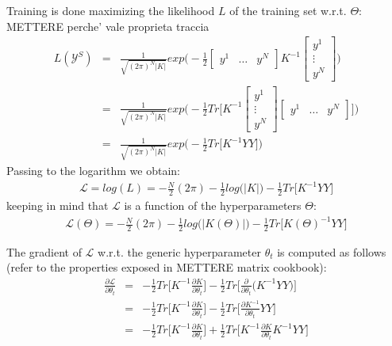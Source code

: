 \documentclass{article}
\begin{document}
Training is done maximizing the likelihood $L$ of the training set w.r.t. $\Theta$:
METTERE perche' vale proprieta traccia
\begin{eqnarray}
L(\mathcal{Y}^S) &=& 
\frac{1}{\sqrt{(2 \pi)^N \left | K \right | }}
exp \bigg ( - \frac{1}{2}
\begin{bmatrix} y^1 & \hdots & y^N \end{bmatrix} 
K^{-1}
\begin{bmatrix} y^1 \\ \vdots \\ y^N \end{bmatrix} 
\bigg ) \\
&=& 
\frac{1}{\sqrt{(2 \pi)^N \left | K \right | }}
exp \bigg ( - \frac{1}{2}
Tr \bigg [ 
K^{-1}
\begin{bmatrix} y^1 \\ \vdots \\ y^N \end{bmatrix} 
\begin{bmatrix} y^1 & \hdots & y^N \end{bmatrix} 
\bigg ]
\bigg ) \\
&=&
\frac{1}{\sqrt{(2 \pi)^N \left | K \right | }}
exp \bigg ( - \frac{1}{2}
Tr \bigg [ 
K^{-1}
YY
\bigg ]
\bigg )
\end{eqnarray}
Passing to the logarithm we obtain:
\begin{eqnarray}
\mathcal{L} = log(L) = 
-\frac{N}{2}(2 \pi) 
-\frac{1}{2} log \big (\left | K \right | \big )
-\frac{1}{2} Tr \bigg [
K^{-1} YY
\bigg ] 
\end{eqnarray}
keeping in mind that $\mathcal{L}$ is a function of the hyperparameters $\Theta$:
\begin{eqnarray}
\mathcal{L}(\Theta) = 
-\frac{N}{2}(2 \pi) 
-\frac{1}{2} log \big (\left | K(\Theta) \right | \big )
-\frac{1}{2} Tr \bigg [
K(\Theta)^{-1} YY
\bigg ] 
\end{eqnarray}

The gradient of $\mathcal{L}$ w.r.t. the generic hyperparameter $\theta_t$ is computed as follows (refer to the properties exposed in METTERE matrix cookbook):
\begin{eqnarray}
\frac{\partial \mathcal{L}}{\partial \theta_t} &=& 
-\frac{1}{2} Tr \bigg [ K^{-1} \frac{\partial K}{\partial \theta_t} \bigg ]
-\frac{1}{2} Tr \bigg [ \frac{\partial }{\partial \theta_t} \big (  
K^{-1} YY
\big ) \bigg ] \\
&=& -\frac{1}{2} Tr \bigg [ K^{-1} \frac{\partial K}{\partial \theta_t} \bigg ]
-\frac{1}{2} Tr \bigg [ \frac{\partial K^{-1}}{\partial \theta_t} YY \bigg ] \\
&=& -\frac{1}{2} Tr \bigg [ K^{-1} \frac{\partial K}{\partial \theta_t} \bigg ]
+\frac{1}{2} Tr \bigg [ K^{-1} \frac{\partial K}{\partial \theta_t} K^{-1} YY \bigg ]
 \label{eq:L_grad}
\end{eqnarray}
\end{document}

